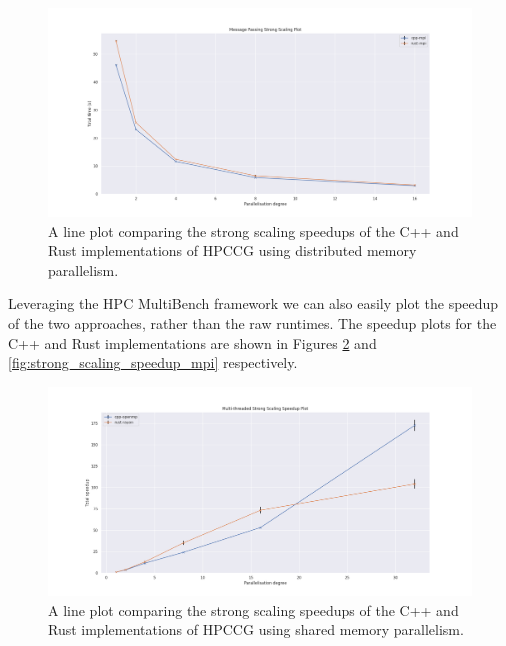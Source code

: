 \begin{figure}[H]
    \centering
    \includegraphics[width=\textwidth]{images/5_performance/scaling/strong_scaling_mpi.png}
    \caption{A line plot comparing the strong scaling speedups of the C++ and Rust implementations of HPCCG using distributed memory parallelism.}
    \label{fig:strong_scaling_mpi}
\end{figure}

Leveraging the HPC MultiBench framework we can also easily plot the speedup of the two approaches, rather than the raw runtimes. The speedup plots for the C++ and Rust implementations are shown in Figures \ref{fig:strong_scaling_speedup_threaded} and \ref{fig:strong_scaling_speedup_mpi} respectively.

\begin{figure}[H]
    \centering
    \includegraphics[width=\textwidth]{images/5_performance/scaling/strong_scaling_speedup_threaded.png}
    \caption{A line plot comparing the strong scaling speedups of the C++ and Rust implementations of HPCCG using shared memory parallelism.}
    \label{fig:strong_scaling_speedup_threaded}
\end{figure}

